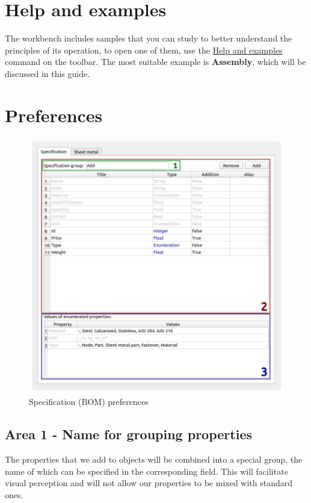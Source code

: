 \documentclass[a4paper,12pt]{article}
\begin{document}
\section{Help and examples}
The workbench includes samples that you can study to better understand the principles of its operation, to open one of them, use the \hyperref[sec:8]{Help and examples} command on the toolbar.
The most suitable example is \textbf{Assembly}, which will be discussed in this guide.

\pagebreak



\section{Preferences}
\begin{figure}[htp]
\centering
\includegraphics[width=1.0\textwidth]{img/pref_specification.png}
\caption{Specification (BOM) preferences}
\label{sec:pref_specification}
\end{figure}

\subsection{Area 1 - Name for grouping properties}
The properties that we add to objects will be combined into a special group, the name of which can be specified in the corresponding field. This will facilitate visual perception and will not allow our properties to be mixed with standard ones.
\end{document}
